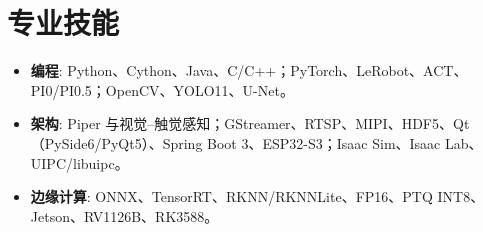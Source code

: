 
\section{专业技能}

\begin{itemize}
\cvprojectbodyfont
    \item \textbf{编程}: Python、Cython、Java、C/C++；PyTorch、LeRobot、ACT、PI0/PI0.5；OpenCV、YOLO11、U-Net。
\end{itemize}

\begin{itemize}
\cvprojectbodyfont
    \item \textbf{架构}: Piper 与视觉--触觉感知；GStreamer、RTSP、MIPI、HDF5、Qt（PySide6/PyQt5）、Spring Boot 3、ESP32-S3；Isaac Sim、Isaac Lab、UIPC/libuipc。
\end{itemize}

\begin{itemize}
\cvprojectbodyfont
    \item \textbf{边缘计算}: ONNX、TensorRT、RKNN/RKNNLite、FP16、PTQ INT8、Jetson、RV1126B、RK3588。
\end{itemize}
